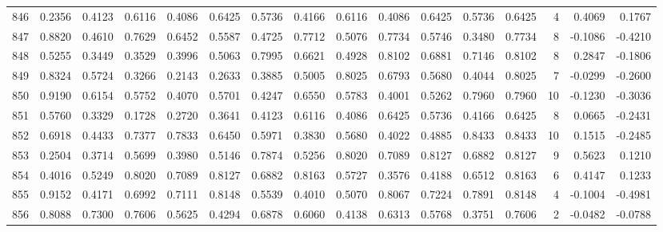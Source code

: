 \begin{tabular}{lrrrrrrrrrrrrrrr}
846 &      0.2356 &  0.4123 &  0.6116 &  0.4086 &  0.6425 &  0.5736 &  0.4166 &  0.6116 &  0.4086 &  0.6425 &   0.5736 &     0.6425 &      4 &                    0.4069 &                     0.1767 \\
847 &      0.8820 &  0.4610 &  0.7629 &  0.6452 &  0.5587 &  0.4725 &  0.7712 &  0.5076 &  0.7734 &  0.5746 &   0.3480 &     0.7734 &      8 &                   -0.1086 &                    -0.4210 \\
848 &      0.5255 &  0.3449 &  0.3529 &  0.3996 &  0.5063 &  0.7995 &  0.6621 &  0.4928 &  0.8102 &  0.6881 &   0.7146 &     0.8102 &      8 &                    0.2847 &                    -0.1806 \\
849 &      0.8324 &  0.5724 &  0.3266 &  0.2143 &  0.2633 &  0.3885 &  0.5005 &  0.8025 &  0.6793 &  0.5680 &   0.4044 &     0.8025 &      7 &                   -0.0299 &                    -0.2600 \\
850 &      0.9190 &  0.6154 &  0.5752 &  0.4070 &  0.5701 &  0.4247 &  0.6550 &  0.5783 &  0.4001 &  0.5262 &   0.7960 &     0.7960 &     10 &                   -0.1230 &                    -0.3036 \\
851 &      0.5760 &  0.3329 &  0.1728 &  0.2720 &  0.3641 &  0.4123 &  0.6116 &  0.4086 &  0.6425 &  0.5736 &   0.4166 &     0.6425 &      8 &                    0.0665 &                    -0.2431 \\
852 &      0.6918 &  0.4433 &  0.7377 &  0.7833 &  0.6450 &  0.5971 &  0.3830 &  0.5680 &  0.4022 &  0.4885 &   0.8433 &     0.8433 &     10 &                    0.1515 &                    -0.2485 \\
853 &      0.2504 &  0.3714 &  0.5699 &  0.3980 &  0.5146 &  0.7874 &  0.5256 &  0.8020 &  0.7089 &  0.8127 &   0.6882 &     0.8127 &      9 &                    0.5623 &                     0.1210 \\
854 &      0.4016 &  0.5249 &  0.8020 &  0.7089 &  0.8127 &  0.6882 &  0.8163 &  0.5727 &  0.3576 &  0.4188 &   0.6512 &     0.8163 &      6 &                    0.4147 &                     0.1233 \\
855 &      0.9152 &  0.4171 &  0.6992 &  0.7111 &  0.8148 &  0.5539 &  0.4010 &  0.5070 &  0.8067 &  0.7224 &   0.7891 &     0.8148 &      4 &                   -0.1004 &                    -0.4981 \\
856 &      0.8088 &  0.7300 &  0.7606 &  0.5625 &  0.4294 &  0.6878 &  0.6060 &  0.4138 &  0.6313 &  0.5768 &   0.3751 &     0.7606 &      2 &                   -0.0482 &                    -0.0788 \\

\end{tabular}
